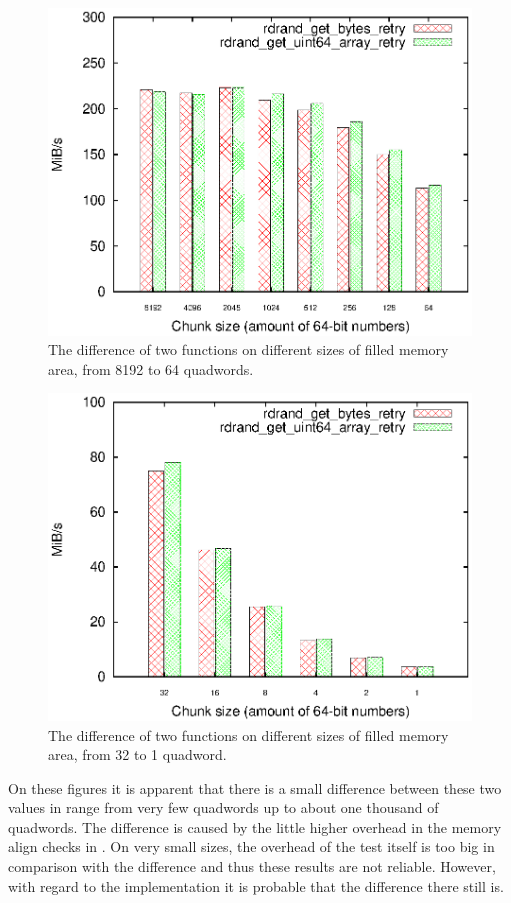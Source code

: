 \begin{figure}[h!]
  \centering
 \includegraphics[width=12cm]{fig/tests/bytes_array_speed_hi.eps} %
\caption{The difference of two functions on different sizes of filled memory area, from 8192 to 64 quadwords.}
\label{fig:testing:bytesArrayHi}
\end{figure}

\begin{figure}[h!]
  \centering
 \includegraphics[width=12cm]{fig/tests/bytes_array_speed_low.eps} %
\caption{The difference of two functions on different sizes of filled memory area, from 32 to 1 quadword.}
\label{fig:testing:bytesArrayLow}
\end{figure}

On these figures it is apparent that there is a small difference between these two values in range from very few quadwords up to about one thousand of quadwords. The difference is caused by the little higher overhead in the memory align checks in . On very small sizes, the overhead of the test itself is too big in comparison with the difference and thus these results are not reliable. However, with regard to the implementation it is probable that the difference there still is.


